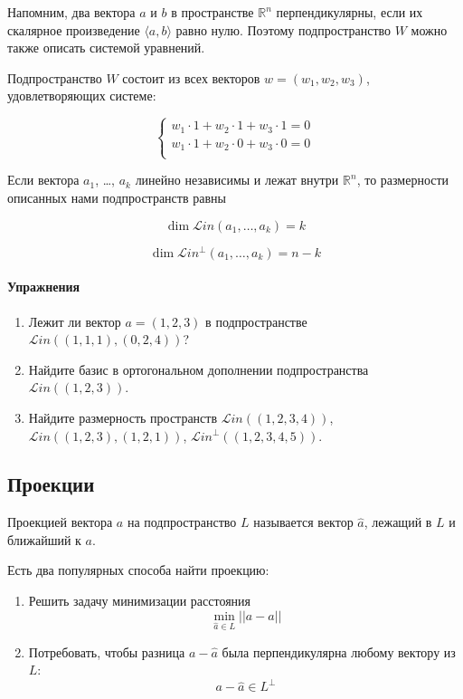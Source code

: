 \documentclass[11pt,russian,]{article}
\let\oldparagraph\paragraph
\renewcommand{\paragraph}[1]{\oldparagraph{#1}\mbox{}}
\newcommand{\RR}{\mathbb{R}}
\renewcommand{\Rn}{\RR^n}
\newcommand{\1}{\mathbbm{1}}
\newcommand{\Lin}{\mathcal{L}in}
\newcommand{\Linp}{\Lin^{\perp}}
\begin{document}
Напомним, два вектора \(a\) и \(b\) в пространстве \(\Rn\)
перпендикулярны, если их скалярное произведение \(\langle a, b \rangle\)
равно нулю. Поэтому подпространство \(W\) можно также описать системой
уравнений.

Подпространство \(W\) состоит из всех векторов \(w=(w_1, w_2, w_3)\),
удовлетворяющих системе:

\[
\begin{cases}
w_1 \cdot 1 + w_2 \cdot 1 + w_3 \cdot 1 = 0 \\
w_1 \cdot 1 + w_2 \cdot 0 + w_3 \cdot 0 = 0 \\
\end{cases}
\]

Если вектора \(a_1\), \ldots, \(a_k\) линейно независимы и лежат внутри
\(\Rn\), то размерности описанных нами подпространств равны

\[
\dim \Lin(a_1, \ldots, a_k) = k
\]

\[
\dim \Linp(a_1, \ldots, a_k) =  n - k
\]

\paragraph{Упражнения}

\begin{enumerate}
\def\labelenumi{\arabic{enumi}.}
\item
  Лежит ли вектор \(a=(1,2,3)\) в подпространстве
  \(\Lin((1,1,1), (0, 2, 4))\)?
\item
  Найдите базис в ортогональном дополнении подпространства
  \(\Lin((1, 2, 3))\).
\item
  Найдите размерность пространств \(\Lin((1, 2, 3, 4))\),
  \(\Lin((1, 2, 3), (1, 2, 1))\), \(\Linp((1, 2, 3, 4, 5))\).
\end{enumerate}

\subsection{Проекции}

Проекцией вектора \(a\) на подпространство \(L\) называется вектор
\(\hat a\), лежащий в \(L\) и ближайший к \(a\).

Есть два популярных способа найти проекцию:

\begin{enumerate}
\def\labelenumi{\arabic{enumi}.}
\item
  Решить задачу минимизации расстояния \[
  \min_{\hat a\in L} ||a - \hat a||
  \]
\item
  Потребовать, чтобы разница \(a-\hat a\) была перпендикулярна любому
  вектору из \(L\): \[
  a- \hat a \in L^{\perp}
  \]
\end{enumerate}
\end{document}

